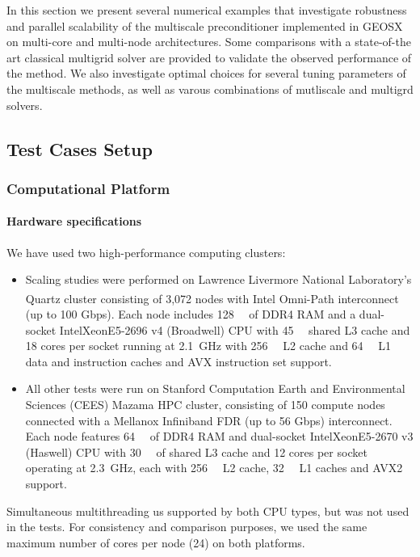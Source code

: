In this section we present several numerical examples that investigate robustness and parallel scalability of the multiscale preconditioner implemented in GEOSX on multi-core and multi-node architectures.   Some comparisons with a state-of-the art classical multigrid solver are provided to validate the observed performance of the method.   We also investigate optimal choices for several tuning parameters of the multiscale methods, as well as varous combinations of mutliscale and multigrd solvers.

\subsection{Test Cases Setup}

\subsubsection{Computational Platform}

\paragraph{Hardware specifications} 
We have used two high-performance computing clusters:
\begin{itemize}
\item Scaling studies were performed on Lawrence Livermore National Laboratory's Quartz cluster consisting of 3,072 nodes with Intel\textsuperscript{\tiny\textregistered} Omni-Path interconnect (up to 100 Gbps).   Each node includes \qty{128}{\mega\byte} of DDR4 RAM and a dual-socket Intel\Registered Xeon\Registered E5-2696 v4 (Broadwell) CPU with \qty{45}{\mega\byte} shared L3 cache and 18 cores per socket running at \qty{2.1}{\GHz} with \qty{256}{\kilo\byte} L2 cache and \qty{64}{\kilo\byte} L1 data and instruction caches and AVX instruction set support.
\item All other tests were run on Stanford Computation Earth and Environmental Sciences (CEES) Mazama HPC cluster, consisting of 150 compute nodes connected with a Mellanox Infiniband FDR (up to 56 Gbps) interconnect.   Each node features \qty{64}{\giga\byte} of DDR4 RAM and dual-socket Intel\Registered Xeon\Registered E5-2670 v3 (Haswell) CPU with \qty{30}{\mega\byte} of shared L3 cache and 12 cores per socket operating at \qty{2.3}{\GHz}, each with \qty{256}{\kilo\byte} L2 cache, \qty{32}{\kilo\byte} L1 caches and AVX2 support.
\end{itemize}
Simultaneous multithreading us supported by both CPU types, but was not used in the tests.   For consistency and comparison purposes, we used the same maximum number of cores per node (24) on both platforms.

